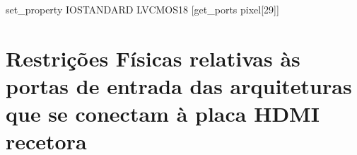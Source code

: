{%
%
%
%
%
%
%
%
%
%
%
%
%
%
%
%
%
%
%
%
%
%
%
%
%
%
%
%
%
set\_property IOSTANDARD LVCMOS18 [get\_ports {pixel[29]}]}

\section{Restrições Físicas relativas às portas de entrada das arquiteturas que se conectam à placa HDMI recetora} \label {ap:fisicas_deHDMI}

